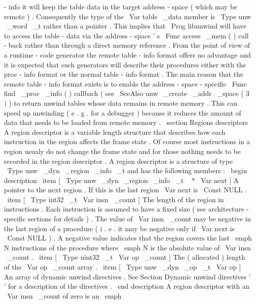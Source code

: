 -
info
it
will
keep
the
table
data
in
the
target
address
-
space
(
which
may
be
remote
)
.
Consequently
the
type
of
the
\
Var
{
table
\
_data
}
member
is
\
Type
{
unw
\
_word
\
_t
}
rather
than
a
pointer
.
This
implies
that
\
Prog
{
libunwind
}
will
have
to
access
the
table
-
data
via
the
address
-
space
'
s
\
Func
{
access
\
_mem
}
(
)
call
-
back
rather
than
through
a
direct
memory
reference
.
From
the
point
of
view
of
a
runtime
-
code
generator
the
remote
table
-
info
format
offers
no
advantage
and
it
is
expected
that
such
generators
will
describe
their
procedures
either
with
the
proc
-
info
format
or
the
normal
table
-
info
format
.
The
main
reason
that
the
remote
table
-
info
format
exists
is
to
enable
the
address
-
space
-
specific
\
Func
{
find
\
_proc
\
_info
}
(
)
callback
(
see
\
SeeAlso
{
unw
\
_create
\
_addr
\
_space
}
(
3
)
)
to
return
unwind
tables
whose
data
remains
in
remote
memory
.
This
can
speed
up
unwinding
(
e
.
g
.
for
a
debugger
)
because
it
reduces
the
amount
of
data
that
needs
to
be
loaded
from
remote
memory
.
\
section
{
Regions
descriptors
}
A
region
descriptor
is
a
variable
length
structure
that
describes
how
each
instruction
in
the
region
affects
the
frame
state
.
Of
course
most
instructions
in
a
region
usualy
do
not
change
the
frame
state
and
for
those
nothing
needs
to
be
recorded
in
the
region
descriptor
.
A
region
descriptor
is
a
structure
of
type
\
Type
{
unw
\
_dyn
\
_region
\
_info
\
_t
}
and
has
the
following
members
:
\
begin
{
description
}
\
item
[
\
Type
{
unw
\
_dyn
\
_region
\
_info
\
_t
~
*
}
\
Var
{
next
}
]
A
pointer
to
the
next
region
.
If
this
is
the
last
region
\
Var
{
next
}
is
\
Const
{
NULL
}
.
\
item
[
\
Type
{
int32
\
_t
}
\
Var
{
insn
\
_count
}
]
The
length
of
the
region
in
instructions
.
Each
instruction
is
assumed
to
have
a
fixed
size
(
see
architecture
-
specific
sections
for
details
)
.
The
value
of
\
Var
{
insn
\
_count
}
may
be
negative
in
the
last
region
of
a
procedure
(
i
.
e
.
it
may
be
negative
only
if
\
Var
{
next
}
is
\
Const
{
NULL
}
)
.
A
negative
value
indicates
that
the
region
covers
the
last
\
emph
{
N
}
instructions
of
the
procedure
where
\
emph
{
N
}
is
the
absolute
value
of
\
Var
{
insn
\
_count
}
.
\
item
[
\
Type
{
uint32
\
_t
}
\
Var
{
op
\
_count
}
]
The
(
allocated
)
length
of
the
\
Var
{
op
\
_count
}
array
.
\
item
[
\
Type
{
unw
\
_dyn
\
_op
\
_t
}
\
Var
{
op
}
]
An
array
of
dynamic
unwind
directives
.
See
Section
Dynamic
unwind
directives
'
'
for
a
description
of
the
directives
.
\
end
{
description
}
A
region
descriptor
with
an
\
Var
{
insn
\
_count
}
of
zero
is
an
\
emph
